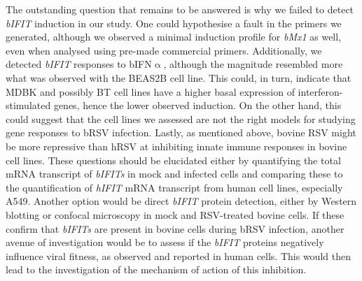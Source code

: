 The outstanding question that remains to be answered is why we failed to detect \textit{bIFIT} induction in our study. One could hypothesise a fault in the primers we generated, although we observed a minimal induction profile for \textit{bMx1} as well, even when analysed using pre-made commercial primers. Additionally, we detected \textit{bIFIT} responses to bIFN$\upalpha$, although the magnitude resembled more what was observed with the BEAS2B cell line. This could, in turn, indicate that MDBK and possibly BT cell lines have a higher basal expression of interferon-stimulated genes, hence the lower observed induction. On the other hand, this could suggest that the cell lines we assessed are not the right models for studying gene responses to bRSV infection. Lastly, as mentioned above, bovine RSV might be more repressive than hRSV at inhibiting innate immune responses in bovine cell lines. These questions should be elucidated either by quantifying the total mRNA transcript of \textit{bIFITs} in mock and infected cells and comparing these to the quantification of \textit{hIFIT} mRNA transcript from human cell lines, especially A549. Another option would be direct \textit{bIFIT} protein detection, either by Western blotting or confocal microscopy in mock and RSV-treated bovine cells. If these confirm that \textit{bIFITs} are present in bovine cells during bRSV infection, another avenue of investigation would be to assess if the \textit{bIFIT} proteins negatively influence viral fitness, as observed and reported in human cells. This would then lead to the investigation of the mechanism of action of this inhibition.

